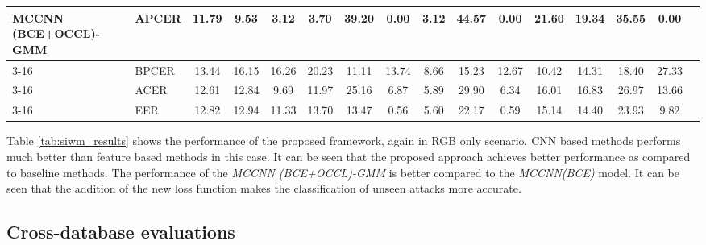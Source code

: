 \documentclass[journal]{IEEEtran}
\begin{document}
\begin{table*}[ht!]
{{\begin{tabular}{l|l|c|c|c|c|c|c|c|c|c|c|c|c|c|c}
	\multirow{4}{*}{\textbf{MCCNN (BCE+OCCL)-GMM}}
	&APCER &  11.79 &  9.53 &   3.12 &   3.70 &  39.20 &    0.00 &   3.12 &   44.57 &   0.00 &  21.60 &  19.34 &  35.55 &   0.00 &  \\ \cline{3-16}
	&BPCER &  13.44 & 16.15 &  16.26 &  20.23 &  11.11 &   13.74 &   8.66 &   15.23 &  12.67 &  10.42 &  14.31 &  18.40 &  27.33 &  \\ \cline{3-16}
	&ACER  &  12.61 & 12.84 &   9.69 &  11.97 &  25.16 &    6.87 &   5.89 &   29.90 &   6.34 &  16.01 &  16.83 &  26.97 &  13.66 &  \\ \cline{3-16}
	&EER   &  12.82 & 12.94 &  11.33 &  13.70 &  13.47 &    0.56 &   5.60 &   22.17 &   0.59 &  15.14 &  14.40 &  23.93 &   9.82 &  \\

    \bottomrule

	\end{tabular}
	}
	}
\label{tab:siwm_results}
\end{table*}

Table \ref{tab:siwm_results} shows the performance of the proposed framework, again in RGB only scenario. CNN based methods performs much better than feature based methods in this case. It can be seen that the proposed approach achieves better performance as compared to baseline methods. The performance of the \textit{MCCNN (BCE+OCCL)-GMM} is better compared to the \textit{MCCNN(BCE)} model. It can be seen that the addition of the new loss function makes the classification of unseen attacks more accurate.

\subsection{Cross-database evaluations}
\end{document}
